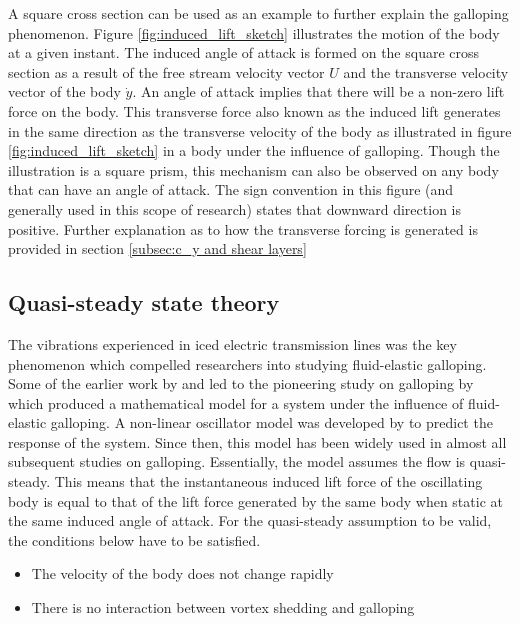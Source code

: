 A square cross section can be used as an example to further explain the galloping phenomenon. Figure \ref{fig:induced_lift_sketch}  illustrates the motion of the body at a given instant. The induced angle of attack is formed on the square cross section as a result of the free stream velocity vector $U$ and the transverse velocity vector of the body $\dot{y}$. An angle of attack implies that there will be a non-zero lift force on the body. This transverse force also known as the induced lift generates in the same direction as the transverse velocity of the body as illustrated in figure \ref{fig:induced_lift_sketch} in a body under the influence of galloping. Though the illustration is a square prism, this mechanism can also be observed on any body that can have an angle of attack. The sign convention in this figure (and generally used in this scope of research) states that downward direction is positive. Further explanation as to how the transverse forcing is generated is provided in section  \ref{subsec:c_y and shear layers}   

\subsection{Quasi-steady state theory}
\label{sec:QSS theory}


The vibrations experienced in iced electric transmission lines was the key phenomenon which compelled researchers into studying fluid-elastic galloping. Some of the earlier work by \cite{Glauert1919} and \cite{DenHartog1956} led to the pioneering study on galloping by \cite{Parkinson1964} which produced a mathematical model for a system under the influence of fluid-elastic galloping. A non-linear oscillator model was developed by \citet{Parkinson1964} to predict the response of the system. Since then, this model has been widely used in almost all subsequent studies on galloping. Essentially, the model assumes the flow is quasi-steady. This means that the instantaneous induced lift force of the oscillating body is equal to that of the lift force generated by the same body when static at the same induced angle of attack. For the quasi-steady assumption to be valid, the conditions below have to be satisfied.

\begin{itemize}
 \item The velocity of the body does not change rapidly
 \item There is no interaction between vortex shedding and galloping
\end{itemize}

